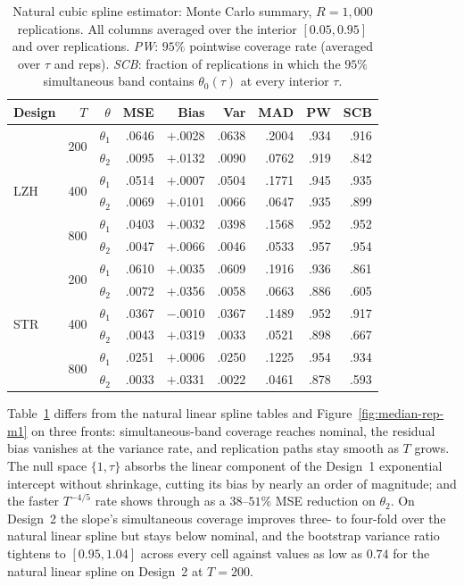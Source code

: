 \documentclass[12pt]{article}
\begin{document}
\begin{table}[H]
\centering
\caption{Natural cubic spline estimator: Monte Carlo summary, $R = 1{,}000$ replications. All columns averaged over the interior $[0.05, 0.95]$ and over replications. \emph{PW}: $95\%$ pointwise coverage rate (averaged over $\tau$ and reps). \emph{SCB}: fraction of replications in which the $95\%$ simultaneous band contains $\theta_0(\tau)$ at every interior $\tau$.}
\label{tab:ncs-mc}
\small
\begin{tabular}{@{}l r rrrrr rr@{}}
\toprule
Design & $T$ & $\theta$ & MSE & Bias & Var & MAD & PW & SCB \\
\midrule
\multirow{6}{*}{LZH}
 & \multirow{2}{*}{200} & $\theta_1$ & .0646 & $+$.0028 & .0638 & .2004 & .934 & .916 \\
 &                      & $\theta_2$ & .0095 & $+$.0132 & .0090 & .0762 & .919 & .842 \\
 & \multirow{2}{*}{400} & $\theta_1$ & .0514 & $+$.0007 & .0504 & .1771 & .945 & .935 \\
 &                      & $\theta_2$ & .0069 & $+$.0101 & .0066 & .0647 & .935 & .899 \\
 & \multirow{2}{*}{800} & $\theta_1$ & .0403 & $+$.0032 & .0398 & .1568 & .952 & .952 \\
 &                      & $\theta_2$ & .0047 & $+$.0066 & .0046 & .0533 & .957 & .954 \\
\midrule
\multirow{6}{*}{STR}
 & \multirow{2}{*}{200} & $\theta_1$ & .0610 & $+$.0035 & .0609 & .1916 & .936 & .861 \\
 &                      & $\theta_2$ & .0072 & $+$.0356 & .0058 & .0663 & .886 & .605 \\
 & \multirow{2}{*}{400} & $\theta_1$ & .0367 & $-$.0010 & .0367 & .1489 & .952 & .917 \\
 &                      & $\theta_2$ & .0043 & $+$.0319 & .0033 & .0521 & .898 & .667 \\
 & \multirow{2}{*}{800} & $\theta_1$ & .0251 & $+$.0006 & .0250 & .1225 & .954 & .934 \\
 &                      & $\theta_2$ & .0033 & $+$.0331 & .0022 & .0461 & .878 & .593 \\
\bottomrule
\end{tabular}
\end{table}

Table~\ref{tab:ncs-mc} differs from the natural linear spline tables and Figure~\ref{fig:median-rep-m1} on three fronts: simultaneous-band coverage reaches nominal, the residual bias vanishes at the variance rate, and replication paths stay smooth as $T$ grows. The null space $\{1,\tau\}$ absorbs the linear component of the Design~1 exponential intercept without shrinkage, cutting its bias by nearly an order of magnitude; and the faster $T^{-4/5}$ rate shows through as a $38$–$51\%$ MSE reduction on $\theta_2$. On Design~2 the slope's simultaneous coverage improves three- to four-fold over the natural linear spline but stays below nominal, and the bootstrap variance ratio tightens to $[0.95, 1.04]$ across every cell against values as low as $0.74$ for the natural linear spline on Design~2 at $T = 200$.
\end{document}
